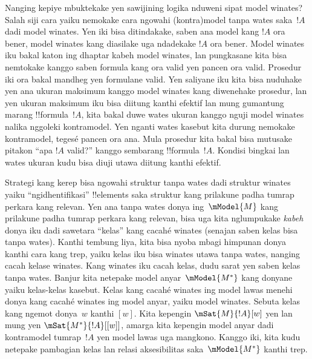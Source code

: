 \documentclass[../../../include/open-logic-section]{subfiles}
\begin{document}
Nanging kepiye mbuktekake yen sawijining logika nduweni sipat model
winates? Salah siji cara yaiku nemokake cara ngowahi (kontra)model
tanpa wates saka~$!A$ dadi model winates. Yen iki bisa ditindakake,
saben ana model kang $!A$ ora bener, model winates kang diasilake uga
ndadekake $!A$ ora bener. Model winates iku bakal katon ing dhaptar
kabeh model winates, lan pungkasane kita bisa nemtokake kanggo saben
formula kang ora valid yen pancen ora valid. Prosedur iki ora bakal
mandheg yen formulane valid. Yen saliyane iku kita bisa nuduhake yen
ana ukuran maksimum kanggo model winates kang diwenehake prosedur,
lan yen ukuran maksimum iku bisa diitung kanthi efektif lan mung gumantung marang
!!{formula}~$!A$, kita bakal duwe wates ukuran kanggo nguji model
winates nalika nggoleki kontramodel. Yen nganti wates kasebut kita
durung nemokake kontramodel, tegesé pancen ora ana. Mula prosedur kita
bakal bisa mutusake pitakon ``apa $!A$ valid?'' kanggo sembarang
!!{formula}~$!A$. Kondisi bingkai lan wates ukuran kudu bisa diuji utawa diitung kanthi efektif.

Strategi kang kerep bisa ngowahi struktur tanpa wates dadi struktur
winates yaiku ``ngidhentifikasi'' !!{element}s saka struktur kang
prilakune padha tumrap perkara kang relevan. Yen ana tanpa wates
donya ing~$\mModel{M}$ kang prilakune padha tumrap perkara kang
relevan, bisa uga kita nglumpukake \emph{kabeh} donya iku dadi
sawetara ``kelas'' kang cacahé winates (senajan saben kelas bisa tanpa
wates). Kanthi tembung liya, kita bisa nyoba mbagi himpunan donya kanthi
cara kang trep, yaiku kelas iku bisa winates utawa tanpa wates,
nanging cacah kelase winates. Kang winates iku cacah kelas, dudu sarat yen saben kelas tanpa wates. Banjur kita netepake
model anyar~$\mModel{M^*}$ kang donyane yaiku kelas-kelas kasebut.
Kelas kang cacahé winates ing model lawas menehi donya kang cacahé
winates ing model anyar, yaiku model winates. Sebuta kelas kang ngemot
donya~$w$ kanthi $[w]$. Kita kepengin $\mSat{M}{!A}[w]$ yen lan mung
yen $\mSat{M^*}{!A}[{[w]}]$, amarga kita kepengin model anyar dadi
kontramodel tumrap~$!A$ yen model lawas uga mangkono. Kanggo iki,
kita kudu netepake pambagian kelas lan relasi aksesibilitas
saka~$\mModel{M^*}$ kanthi trep.
\end{document}

